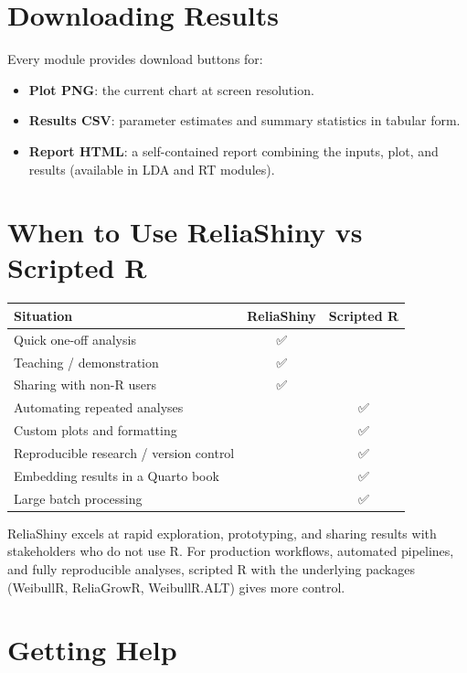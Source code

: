 \documentclass[
  letterpaper,
  DIV=11,
  numbers=noendperiod]{scrreprt}
\newcounter{none} %
\providecommand{\tightlist}{%
  \setlength{\itemsep}{0pt}\setlength{\parskip}{0pt}}
\begin{document}
\section{Downloading Results}\label{downloading-results}

Every module provides download buttons for:

\begin{itemize}
\tightlist
\item
  \textbf{Plot PNG}: the current chart at screen resolution.
\item
  \textbf{Results CSV}: parameter estimates and summary statistics in
  tabular form.
\item
  \textbf{Report HTML}: a self-contained report combining the inputs,
  plot, and results (available in LDA and RT modules).
\end{itemize}

\section{When to Use ReliaShiny vs Scripted
R}\label{when-to-use-reliashiny-vs-scripted-r}

{\def\LTcaptype{none} %
\begin{longtable}[]{@{}lcc@{}}
\toprule\noalign{}
Situation & ReliaShiny & Scripted R \\
\midrule\noalign{}
\endhead
\bottomrule\noalign{}
\endlastfoot
Quick one-off analysis & ✅ & \\
Teaching / demonstration & ✅ & \\
Sharing with non-R users & ✅ & \\
Automating repeated analyses & & ✅ \\
Custom plots and formatting & & ✅ \\
Reproducible research / version control & & ✅ \\
Embedding results in a Quarto book & & ✅ \\
Large batch processing & & ✅ \\
\end{longtable}
}

ReliaShiny excels at rapid exploration, prototyping, and sharing results
with stakeholders who do not use R. For production workflows, automated
pipelines, and fully reproducible analyses, scripted R with the
underlying packages (WeibullR, ReliaGrowR, WeibullR.ALT) gives more
control.

\section{Getting Help}\label{getting-help-1}
\end{document}
